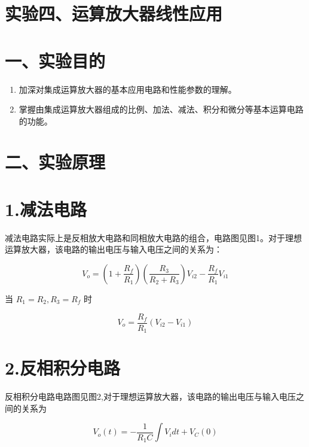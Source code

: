 \documentclass[
  10
]{article}
\providecommand{\tightlist}{%
  \setlength{\itemsep}{0pt}\setlength{\parskip}{0pt}}
\begin{document}
\section{实验四、运算放大器线性应用}\label{ux5b9eux9a8cux56dbux8fd0ux7b97ux653eux5927ux5668ux7ebfux6027ux5e94ux7528}

\section{一、实验目的}\label{ux4e00ux5b9eux9a8cux76eeux7684-2}

\begin{enumerate}
\def\labelenumi{\arabic{enumi}.}
\tightlist
\item
  加深对集成运算放大器的基本应用电路和性能参数的理解。\\
\item
  掌握由集成运算放大器组成的比例、加法、减法、积分和微分等基本运算电路的功能。
\end{enumerate}

\section{二、实验原理}\label{ux4e8cux5b9eux9a8cux539fux7406-2}

\section{1.减法电路}\label{ux51cfux6cd5ux7535ux8def}

减法电路实际上是反相放大电路和同相放大电路的组合，电路图见图1。对于理想运算放大器，该电路的输出电压与输入电压之间的关系为：

\[
V _ {o} = \left(1 + \frac {R _ {f}}{R _ {1}}\right) \left(\frac {R _ {3}}{R _ {2} + R _ {3}}\right) V _ {i 2} - \frac {R _ {f}}{R _ {1}} V _ {i 1}
\]

当 \(R_{1} = R_{2}, R_{3} = R_{f}\) 时

\[
V _ {o} = \frac {R _ {f}}{R _ {1}} \left(V _ {i 2} - V _ {i 1}\right)
\]

\section{2.反相积分电路}\label{ux53cdux76f8ux79efux5206ux7535ux8def}

反相积分电路电路图见图2,对于理想运算放大器，该电路的输出电压与输入电压之间的关系为

\[
V _ {o} (t) = - \frac {1}{R _ {1} C} \int V _ {i} d t + V _ {C} (0)
\]
\end{document}
